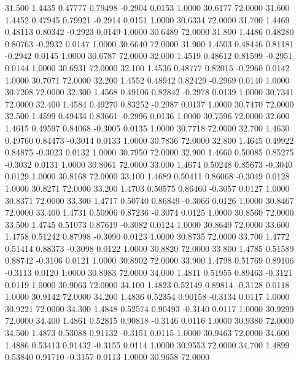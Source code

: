   31.500   1.4435   0.47777   0.79498  -0.2904   0.0153   1.0000  30.6177  72.0000
  31.600   1.4452   0.47945   0.79921  -0.2914   0.0151   1.0000  30.6334  72.0000
  31.700   1.4469   0.48113   0.80342  -0.2923   0.0149   1.0000  30.6489  72.0000
  31.800   1.4486   0.48280   0.80763  -0.2932   0.0147   1.0000  30.6640  72.0000
  31.900   1.4503   0.48446   0.81181  -0.2942   0.0145   1.0000  30.6787  72.0000
  32.000   1.4519   0.48612   0.81599  -0.2951   0.0144   1.0000  30.6931  72.0000
  32.100   1.4536   0.48777   0.82015  -0.2960   0.0142   1.0000  30.7071  72.0000
  32.200   1.4552   0.48942   0.82429  -0.2969   0.0140   1.0000  30.7208  72.0000
  32.300   1.4568   0.49106   0.82842  -0.2978   0.0139   1.0000  30.7341  72.0000
  32.400   1.4584   0.49270   0.83252  -0.2987   0.0137   1.0000  30.7470  72.0000
  32.500   1.4599   0.49434   0.83661  -0.2996   0.0136   1.0000  30.7596  72.0000
  32.600   1.4615   0.49597   0.84068  -0.3005   0.0135   1.0000  30.7718  72.0000
  32.700   1.4630   0.49760   0.84473  -0.3014   0.0133   1.0000  30.7836  72.0000
  32.800   1.4645   0.49922   0.84875  -0.3023   0.0132   1.0000  30.7950  72.0000
  32.900   1.4660   0.50085   0.85275  -0.3032   0.0131   1.0000  30.8061  72.0000
  33.000   1.4674   0.50248   0.85673  -0.3040   0.0129   1.0000  30.8168  72.0000
  33.100   1.4689   0.50411   0.86068  -0.3049   0.0128   1.0000  30.8271  72.0000
  33.200   1.4703   0.50575   0.86460  -0.3057   0.0127   1.0000  30.8371  72.0000
  33.300   1.4717   0.50740   0.86849  -0.3066   0.0126   1.0000  30.8467  72.0000
  33.400   1.4731   0.50906   0.87236  -0.3074   0.0125   1.0000  30.8560  72.0000
  33.500   1.4745   0.51073   0.87619  -0.3082   0.0124   1.0000  30.8649  72.0000
  33.600   1.4758   0.51242   0.87998  -0.3090   0.0123   1.0000  30.8735  72.0000
  33.700   1.4772   0.51414   0.88373  -0.3098   0.0122   1.0000  30.8820  72.0000
  33.800   1.4785   0.51589   0.88742  -0.3106   0.0121   1.0000  30.8902  72.0000
  33.900   1.4798   0.51769   0.89106  -0.3113   0.0120   1.0000  30.8983  72.0000
  34.000   1.4811   0.51955   0.89463  -0.3121   0.0119   1.0000  30.9063  72.0000
  34.100   1.4823   0.52149   0.89814  -0.3128   0.0118   1.0000  30.9142  72.0000
  34.200   1.4836   0.52354   0.90158  -0.3134   0.0117   1.0000  30.9221  72.0000
  34.300   1.4848   0.52574   0.90493  -0.3140   0.0117   1.0000  30.9299  72.0000
  34.400   1.4861   0.52815   0.90818  -0.3146   0.0116   1.0000  30.9380  72.0000
  34.500   1.4873   0.53088   0.91132  -0.3151   0.0115   1.0000  30.9463  72.0000
  34.600   1.4886   0.53413   0.91432  -0.3155   0.0114   1.0000  30.9553  72.0000
  34.700   1.4899   0.53840   0.91710  -0.3157   0.0113   1.0000  30.9658  72.0000
